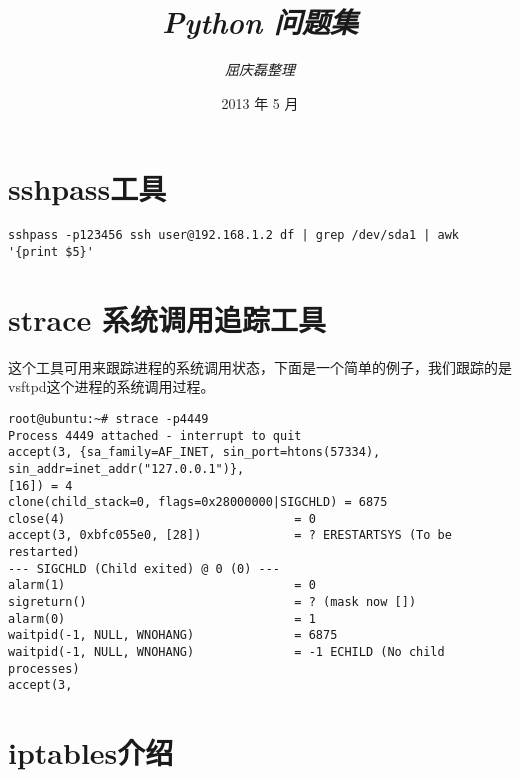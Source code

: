 \documentclass{article}
\begin{document}
\title{%
  {\huge \textit{Python 问题集}\\\smallskip}%
}

\author{\textit{屈庆磊整理} \\[3mm]
       }

\date{2013 年 5 月}

\maketitle

\begin{multicols}{2}
\tableofcontents
\end{multicols}


\section{sshpass工具}
\begin{verbatim}
sshpass -p123456 ssh user@192.168.1.2 df | grep /dev/sda1 | awk '{print $5}'
\end{verbatim}

\section{strace 系统调用追踪工具}
这个工具可用来跟踪进程的系统调用状态，下面是一个简单的例子，我们跟踪的是
vsftpd这个进程的系统调用过程。

\begin{verbatim}
root@ubuntu:~# strace -p4449
Process 4449 attached - interrupt to quit
accept(3, {sa_family=AF_INET, sin_port=htons(57334), sin_addr=inet_addr("127.0.0.1")}, 
[16]) = 4
clone(child_stack=0, flags=0x28000000|SIGCHLD) = 6875
close(4)                                = 0
accept(3, 0xbfc055e0, [28])             = ? ERESTARTSYS (To be restarted)
--- SIGCHLD (Child exited) @ 0 (0) ---
alarm(1)                                = 0
sigreturn()                             = ? (mask now [])
alarm(0)                                = 1
waitpid(-1, NULL, WNOHANG)              = 6875
waitpid(-1, NULL, WNOHANG)              = -1 ECHILD (No child processes)
accept(3, 

\end{verbatim}
\section{iptables介绍}
\end{document}

